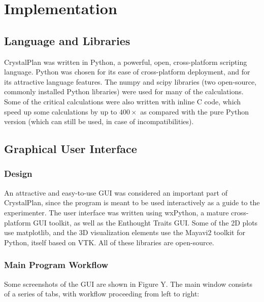 \documentclass{iucr}              %
\begin{document}
\section{Implementation}


\subsection{Language and Libraries}

CrystalPlan was written in Python, a powerful, open, cross-platform scripting
language. Python was chosen for its ease of cross-platform deployment, and for
its attractive language features. The numpy and scipy libraries (two
open-source, commonly installed Python libraries) were used for many of the
calculations. Some of the critical calculations were also written with inline C
code, which speed up some calculations by up to $400\times$ as compared with
the pure Python version (which can still be used, in case of incompatibilities).       


\subsection{Graphical User Interface}

\subsubsection{Design}

An attractive and easy-to-use GUI was considered an important part of
CrystalPlan, since the program is meant to be used interactively as a guide to
the experimenter. The user interface was written using wxPython, a mature
cross-platform GUI toolkit, as well as the Enthought Traits GUI. Some of the 2D
plots use matplotlib, and the 3D visualization elements use the Mayavi2 toolkit
for Python, itself based on VTK. All of these libraries are open-source.       

\subsubsection{Main Program Workflow}
Some screenshots of the GUI are shown in Figure Y. The main window consists of a
series of tabs, with workflow proceeding from left to right:  
\end{document}
